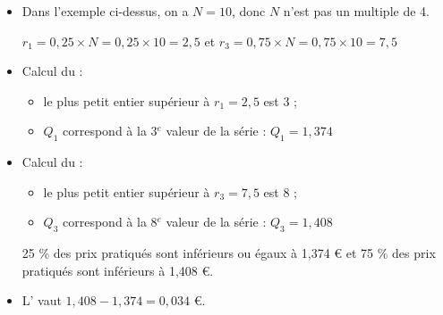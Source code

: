 \begin{myex}
	
	
	\begin{itemize}		

		\item Dans l'exemple ci-dessus, on a $N = 10$, donc $N$ n'est pas un multiple de 4.
		
		$r_1 = 0,25 \times N = 0,25 \times 10 = 2,5$ et $ r_3 = 0,75 \times N = 0,75 \times 10 = 7,5 $
		

		\item Calcul du  :
		\begin{itemize}
			\item le plus petit entier supérieur à $r_1 = 2,5$ est 3 ;
			\item $Q_1$ correspond à la 3$^e$ valeur de la série : $Q_1 = 1,374$
		\end{itemize}
		
		\item Calcul du  :
		\begin{itemize}
			\item le plus petit entier supérieur à $r_3 = 7,5$ est 8 ;
			\item $Q_3$ correspond à la 8$^e$ valeur de la série : $Q_3 = 1,408$
		\end{itemize}
		
		25 \% des prix pratiqués sont inférieurs ou égaux à 1,374 € et 75 \% des prix pratiqués sont inférieurs à 1,408 €.
		
		
		\item L' vaut $1,408 - 1,374 = 0,034$ €.
	\end{itemize}
\end{myex}